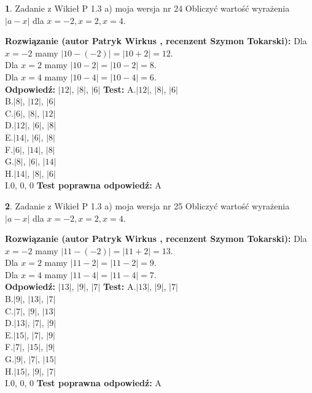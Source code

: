 \documentclass[12pt, a4paper]{article}
\theoremstyle{definition} %
\newtheorem{zad}{}
\newcommand{\zadStart}[1]{\begin{zad}#1\newline}
\newcommand{\zadStop}{\end{zad}}
\newcommand{\rozwStart}[2]{\noindent \textbf{Rozwiązanie (autor #1 , recenzent #2): }\newline}
\newcommand{\rozwStop}{\newline}
\newcommand{\odpStart}{\noindent \textbf{Odpowiedź:}\newline}
\newcommand{\odpStop}{\newline}
\newcommand{\testStart}{\noindent \textbf{Test:}\newline}
\newcommand{\testStop}{\newline}
\newcommand{\kluczStart}{\noindent \textbf{Test poprawna odpowiedź:}\newline}
\newcommand{\kluczStop}{\newline}
\begin{document}
\zadStart{Zadanie z Wikieł P 1.3 a) moja wersja nr 24}
Obliczyć wartość wyrażenia $|a - x|$ dla $x=-2,x=2,x=4$.
\zadStop
\rozwStart{Patryk Wirkus}{Szymon Tokarski}
Dla $x = -2$ mamy $|10 - (-2)| = |10 + 2| = 12$.\\
Dla $x = 2$ mamy $|10 - 2| = |10 - 2| = 8$.\\
Dla $x = 4$ mamy $|10 - 4| = |10 - 4| = 6$.\\
\rozwStop
\odpStart
$|12|$, $|8|$, $|6|$
\odpStop
\testStart
A.$|12|$, $|8|$, $|6|$\\
B.$|8|$, $|12|$, $|6|$\\
C.$|6|$, $|8|$, $|12|$\\
D.$|12|$, $|6|$, $|8|$\\
E.$|14|$, $|6|$, $|8|$\\
F.$|6|$, $|14|$, $|8|$\\
G.$|8|$, $|6|$, $|14|$\\
H.$|14|$, $|8|$, $|6|$\\
I.$0$, $0$, $0$
\testStop
\kluczStart
A
\kluczStop



\zadStart{Zadanie z Wikieł P 1.3 a) moja wersja nr 25}
Obliczyć wartość wyrażenia $|a - x|$ dla $x=-2,x=2,x=4$.
\zadStop
\rozwStart{Patryk Wirkus}{Szymon Tokarski}
Dla $x = -2$ mamy $|11 - (-2)| = |11 + 2| = 13$.\\
Dla $x = 2$ mamy $|11 - 2| = |11 - 2| = 9$.\\
Dla $x = 4$ mamy $|11 - 4| = |11 - 4| = 7$.\\
\rozwStop
\odpStart
$|13|$, $|9|$, $|7|$
\odpStop
\testStart
A.$|13|$, $|9|$, $|7|$\\
B.$|9|$, $|13|$, $|7|$\\
C.$|7|$, $|9|$, $|13|$\\
D.$|13|$, $|7|$, $|9|$\\
E.$|15|$, $|7|$, $|9|$\\
F.$|7|$, $|15|$, $|9|$\\
G.$|9|$, $|7|$, $|15|$\\
H.$|15|$, $|9|$, $|7|$\\
I.$0$, $0$, $0$
\testStop
\kluczStart
A
\kluczStop
\end{document}
